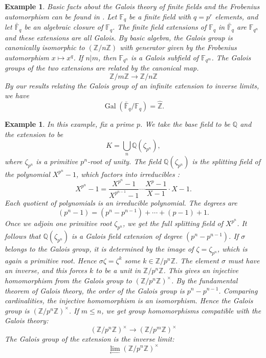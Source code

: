\documentclass{amsart}
\def\op#1{{\operatorname{#1}}}
\newcommand{\ring}[1]{\mathbb{#1}}
\newtheorem{example}[exercise]{Example}
\begin{document}
\begin{example}  
Basic facts about the Galois theory of finite fields and the Frobenius
automorphism can be found in
\cite[Chapter~IX,Prop.~9.40]{knapp-basic}.
Let $\ring{F}_q$ be a finite field with $q=p^r$ elements, and
let $\bar{\ring{F}}_q$ be an algebraic closure of $\ring{F}_q$.
The finite field extensions of $\ring{F}_q$ in $\bar{\ring{F}}_q$
are $\ring{F}_{q^n}$ and these extensions are all Galois.  
By basic algebra, the Galois group is
canonically isomorphic to $(\ring{Z}/n\ring{Z})$ with generator given by the
Frobenius automorphism $x\mapsto x^q$.  If $n|m$, then $\ring{F}_{q^n}$ is a Galois subfield
of $\ring{F}_{q^m}$.   The Galois groups of the two extensions are related by
the canonical map.
\[
\ring{Z}/m\ring{Z} \to \ring{Z}/n\ring{Z}
\]
By our results relating the Galois group of an infinite extension to inverse limits, we
have
\[
\op{Gal}(\bar{\ring{F}}_q/\ring{F}_q) = \hat{\ring{Z}}.
\]
\end{example}

\begin{example} In this example, fix a prime $p$.
We take the base field to be $\ring{Q}$ and
the extension to be 
\[
K=\bigcup_n \ring{Q}(\zeta_{p^n}),
\]
where $\zeta_{p^n}$ is a primitive $p^n$-root of unity.
The field $\ring{Q}(\zeta_{p^n})$ is the splitting field of the polynomial $X^{p^n}-1$,
which factors into irreducibles \cite[Lemma~9.42]{knapp-basic}:
\[
X^{p^n}-1 = \frac{X^{p^n}-1}{X^{p^{n-1}}-1}\cdots \frac{X^p-1}{X-1} \cdot {X-1}.
\]
Each quotient of polynomials is an irreducible polynomial.  The degrees are
\[
(p^n-1) = (p^n-p^{n-1}) + \cdots + (p-1) + 1.
\]
Once we adjoin one primitive root $\zeta_{p^n}$, we get the full
splitting field of $X^{p^n}$.  It follows that $\ring{Q}(\zeta_{p^n})$
is a Galois field extension of degree $(p^n-p^{n-1})$.  If $\sigma$
belongs to the Galois group, it is determined by the image of
$\zeta=\zeta_{p^n}$, which is again a primitive root.  Hence
$\sigma\zeta = \zeta^k$ some $k\in\ring{Z}/p^n\ring{Z}$.  The element
$\sigma$ must have an inverse, and this forces $k$ to be a unit in
$\ring{Z}/p^n\ring{Z}$.  This gives an injective homomorphism from the
Galois group to $(\ring{Z}/p^n\ring{Z})^\times$.  By the fundamental
theorem of Galois theory, the order of the Galois group is $p^n
-p^{n-1}$. Comparing cardinalities, the injective homomorphism is an
isomorphism.  Hence the Galois group is
$(\ring{Z}/p^n\ring{Z})^\times$.  If $m\le n$, we get group
homomorphisms compatible with the Galois theory:
\[
(\ring{Z}/p^n\ring{Z})^\times \to (\ring{Z}/p^m\ring{Z})^\times
\]
The Galois group of the extension is the inverse limit:
\[
\lim_{\leftarrow} (\ring{Z}/p^n\ring{Z})^\times
\]
\end{example}
\end{document}
